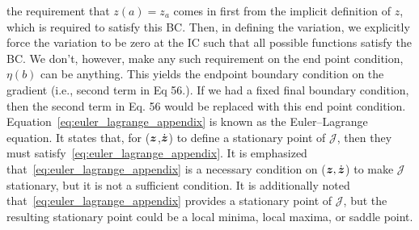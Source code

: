 \documentclass[3p,computermodern,10pt]{elsarticle}
\begin{document}
\begin{appendices}
{the requirement that $z(a)=z_a$ comes in first from the implicit definition of $z$, which is required to satisfy this BC. Then, in defining the variation, 
we explicitly force the variation to be zero at the IC such that all possible functions satisfy the BC. We don't, however, make any such requirement on the end point 
condition, $\eta(b)$ can be anything. This yields the endpoint boundary condition on the gradient (i.e., second term in Eq 56.). If we had a fixed final boundary condition, then the second term in Eq. 56 would be replaced 
with this end point condition.} 
Equation~\eqref{eq:euler_lagrange_appendix} is known as the Euler--Lagrange
equation. It states that, for ($\boldsymbol z$,$\dot{\boldsymbol z}$) to define a stationary point of $\mathcal{J}$, then they must 
satisfy~\eqref{eq:euler_lagrange_appendix}. It is emphasized
that~\eqref{eq:euler_lagrange_appendix} is a necessary condition on ($\boldsymbol z,\dot{\boldsymbol z}$)
to make $\mathcal{J}$ stationary, but it is not a sufficient condition. It is
additionally noted that~\eqref{eq:euler_lagrange_appendix} provides a
stationary point of $\mathcal{J}$, but the resulting stationary point could be a local minima, local maxima, or saddle point.


\end{appendices}
\end{document}

